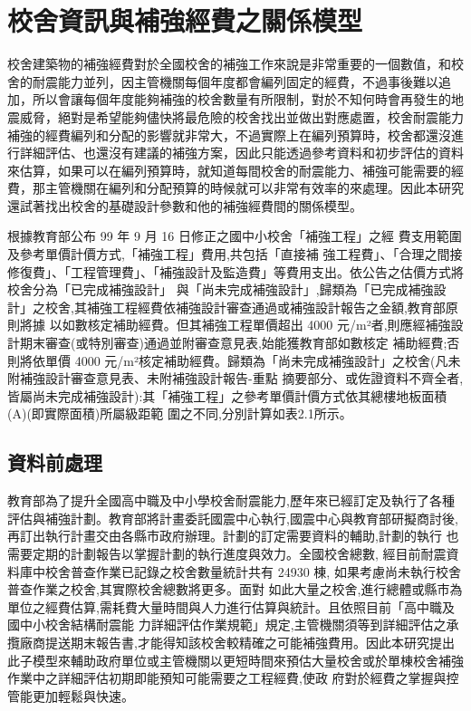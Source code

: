 \renewcommand\thetable{\arabic{chapter}-\arabic{table}}
\chapter{校舍資訊與補強經費之關係模型}

校舍建築物的補強經費對於全國校舍的補強工作來說是非常重要的一個數值，和校舍的耐震能力並列，因主管機關每個年度都會編列固定的經費，不過事後難以追加，所以會讓每個年度能夠補強的校舍數量有所限制，對於不知何時會再發生的地震威脅，絕對是希望能夠儘快將最危險的校舍找出並做出對應處置，校舍耐震能力補強的經費編列和分配的影響就非常大，不過實際上在編列預算時，校舍都還沒進行詳細評估、也還沒有建議的補強方案，因此只能透過參考資料和初步評估的資料來估算，如果可以在編列預算時，就知道每間校舍的耐震能力、補強可能需要的經費，那主管機關在編列和分配預算的時候就可以非常有效率的來處理。因此本研究還試著找出校舍的基礎設計參數和他的補強經費間的關係模型。

根據教育部公布 99 年 9 月 16 日修正之國中小校舍「補強工程」之經 費支用範圍及參考單價計價方式,「補強工程」費用,共包括「直接補 強工程費」、「合理之間接修復費」、「工程管理費」、「補強設計及監造費」等費用支出。依公告之估價方式將校舍分為「已完成補強設計」 與「尚未完成補強設計」,歸類為「已完成補強設計」之校舍,其補強工程經費依補強設計審查通過或補強設計報告之金額,教育部原則將據 以如數核定補助經費。但其補強工程單價超出 4000 元/m²者,則應經補強設計期末審查(或特別審查)通過並附審查意見表,始能獲教育部如數核定 補助經費;否則將依單價 4000 元/m²核定補助經費。歸類為「尚未完成補強設計」之校舍(凡未附補強設計審查意見表、未附補強設計報告-重點 摘要部分、或佐證資料不齊全者,皆屬尚未完成補強設計):其「補強工程」之參考單價計價方式依其總樓地板面積(A)(即實際面積)所屬級距範 圍之不同,分別計算如表2.1所示。

\section{資料前處理}

教育部為了提升全國高中職及中小學校舍耐震能力,歷年來已經訂定及執行了各種評估與補強計劃。教育部將計畫委託國震中心執行,國震中心與教育部研擬商討後,再訂出執行計畫交由各縣市政府辦理。計劃的訂定需要資料的輔助,計劃的執行 也需要定期的計劃報告以掌握計劃的執行進度與效力。全國校舍總數, 經目前耐震資料庫中校舍普查作業已記錄之校舍數量統計共有 24930 棟, 如果考慮尚未執行校舍普查作業之校舍,其實際校舍總數將更多。面對 如此大量之校舍,進行總體或縣市為單位之經費估算,需耗費大量時間與人力進行估算與統計。且依照目前「高中職及國中小校舍結構耐震能 力詳細評估作業規範」規定,主管機關須等到詳細評估之承攬廠商提送期末報告書,才能得知該校舍較精確之可能補強費用。因此本研究提出 此子模型來輔助政府單位或主管機關以更短時間來預估大量校舍或於單棟校舍補強作業中之詳細評估初期即能預知可能需要之工程經費,使政 府對於經費之掌握與控管能更加輕鬆與快速。

